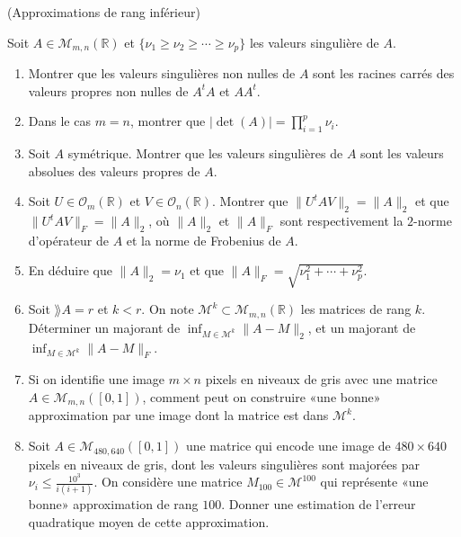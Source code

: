 \documentclass[a4paper,12pt,reqno]{amsart}
\begin{document}
\begin{exo} (Approximations de rang inférieur)

Soit $A \in \mathcal{M}_{m,n}(\mathbb{R})$ et $\{ \nu_{1} \geq \nu_{2} \geq \cdots \geq \nu_{p}\}$ les valeurs singulière de $A$.

    \begin{enumerate}

        \item Montrer que les valeurs singulières non nulles de $A$ sont les racines carrés des valeurs propres non nulles de $A^{t}A$ et $AA^{t}$.

        \item Dans le cas $m=n$, montrer que $ |\det(A)| = \prod_{i=1}^{p} \nu_{i}$.

        \item Soit $A$ symétrique. Montrer que les valeurs singulières de $A$ sont les valeurs absolues des valeurs propres de $A$.

        \item Soit $U \in \mathcal{O}_{m}(\mathbb{R})$ et $V \in \mathcal{O}_{n}(\mathbb{R})$. Montrer que $\| U^{t} A  V\|_{2} = \| A \|_{2}$ et que $\| U^{t} A  V\|_{F} = \| A \|_{2}$, où $\| A \|_{2}$ et $\| A \|_{F}$ sont respectivement la $2$-norme d'opérateur de $A$ et la norme de Frobenius de $A$.

        \item En déduire que $\| A \|_{2} = \nu_{1}$ et que $\| A \|_{F} = \sqrt{\nu_{1}^{2}+\cdots+\nu_{p}^{2}}$.

        \item Soit $\rang A = r$ et $k < r$. On note $\mathcal{M}^{k} \subset \mathcal{M}_{m,n}(\mathbb{R})$ les matrices de rang $k$.  Déterminer un majorant de $\inf_{M \in \mathcal{M}^{k}}\| A - M\|_{2}$, et un majorant de $\inf_{M \in \mathcal{M}^{k}}\| A - M\|_{F}$.

        \item Si on identifie une image $m \times n$ pixels en niveaux de gris avec une matrice $A \in \mathcal{M}_{m,n}([0,1])$, comment peut on construire «une bonne» approximation par une image dont la matrice est dans $\mathcal{M}^{k}$.

        \item Soit $A \in \mathcal{M}_{480,640}([0,1])$ une matrice qui encode une image de $480 \times 640$ pixels en niveaux de gris, dont les valeurs singulières sont majorées par $\nu_{i} \leq \frac{10^{3}}{i(i+1)}$. On considère une matrice $M_{100} \in \mathcal{M}^{100}$ qui représente «une bonne» approximation de rang $100$. Donner une estimation de l'erreur quadratique moyen de cette approximation.
    \end{enumerate}
\end{exo}
\end{document}
